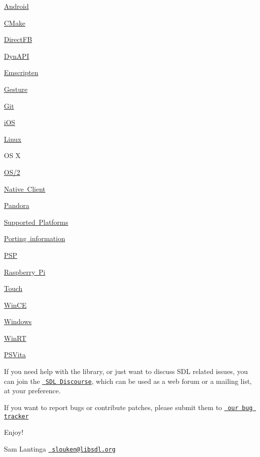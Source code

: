 \begin{DoxyItemize}
\item \mbox{\hyperlink{md__d___ray_tracing_docs__r_e_a_d_m_e_android}{Android}}
\item \mbox{\hyperlink{md__d___ray_tracing_docs__r_e_a_d_m_e_cmake}{CMake}}
\item \mbox{\hyperlink{md__d___ray_tracing_docs__r_e_a_d_m_e_directfb}{Direct\+FB}}
\item \mbox{\hyperlink{md__d___ray_tracing_docs__r_e_a_d_m_e_dynapi}{Dyn\+API}}
\item \mbox{\hyperlink{md__d___ray_tracing_docs__r_e_a_d_m_e_emscripten}{Emscripten}}
\item \mbox{\hyperlink{md__d___ray_tracing_docs__r_e_a_d_m_e_gesture}{Gesture}}
\item \mbox{\hyperlink{md__d___ray_tracing_docs__r_e_a_d_m_e_git}{Git}}
\item \mbox{\hyperlink{md__d___ray_tracing_docs__r_e_a_d_m_e_ios}{i\+OS}}
\item \mbox{\hyperlink{md__d___ray_tracing_docs__r_e_a_d_m_e_linux}{Linux}}
\item OS X
\item \mbox{\hyperlink{md__d___ray_tracing_docs__r_e_a_d_m_e_os2}{OS/2}}
\item \mbox{\hyperlink{md__d___ray_tracing_docs__r_e_a_d_m_e_nacl}{Native Client}}
\item \mbox{\hyperlink{md__d___ray_tracing_docs__r_e_a_d_m_e_pandora}{Pandora}}
\item \mbox{\hyperlink{md__d___ray_tracing_docs__r_e_a_d_m_e_platforms}{Supported Platforms}}
\item \mbox{\hyperlink{md__d___ray_tracing_docs__r_e_a_d_m_e_porting}{Porting information}}
\item \mbox{\hyperlink{md__d___ray_tracing_docs__r_e_a_d_m_e_psp}{PSP}}
\item \mbox{\hyperlink{md__d___ray_tracing_docs__r_e_a_d_m_e_raspberrypi}{Raspberry Pi}}
\item \mbox{\hyperlink{md__d___ray_tracing_docs__r_e_a_d_m_e_touch}{Touch}}
\item \mbox{\hyperlink{md__d___ray_tracing_docs__r_e_a_d_m_e_wince}{Win\+CE}}
\item \mbox{\hyperlink{md__d___ray_tracing_docs__r_e_a_d_m_e_windows}{Windows}}
\item \mbox{\hyperlink{md__d___ray_tracing_docs__r_e_a_d_m_e_winrt}{Win\+RT}}
\item \mbox{\hyperlink{md__d___ray_tracing_docs__r_e_a_d_m_e_vita}{PSVita}}
\end{DoxyItemize}

If you need help with the library, or just want to discuss SDL related issues, you can join the \href{https://discourse.libsdl.org/}{\texttt{ SDL Discourse}}, which can be used as a web forum or a mailing list, at your preference.

If you want to report bugs or contribute patches, please submit them to \href{https://github.com/libsdl-org/SDL/issues}{\texttt{ our bug tracker}}

Enjoy!

Sam Lantinga \href{mailto:slouken@libsdl.org}{\texttt{ slouken@libsdl.\+org}} 